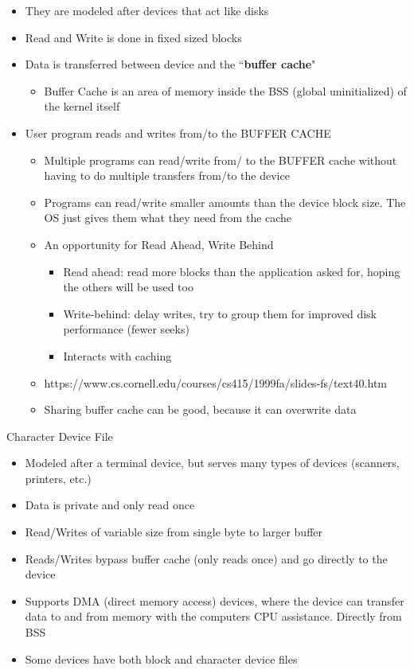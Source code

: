 \begin{itemize}
    \item They are modeled after devices that act like disks
    \item Read and Write is done in fixed sized blocks
    \item Data is transferred between device and the ``\textbf{buffer cache}"
    \begin{itemize}
        \item Buffer Cache is an area of memory inside the BSS (global uninitialized) of the kernel itself
    \end{itemize}
    \item User program reads and writes from/to the BUFFER CACHE
    \begin{itemize}
        \item Multiple programs can read/write from/ to the BUFFER cache without having to do multiple transfers from/to the device
        \item Programs can read/write smaller amounts than the device block size. The OS just gives them what they need from the cache
        \item An opportunity for Read Ahead, Write Behind
        \begin{itemize}
            \item Read ahead: read more blocks than the application asked for, hoping the others will be used too
            \item Write-behind: delay writes, try to group them for improved disk performance (fewer seeks)
            \item Interacts with caching
        \end{itemize}
        \item https://www.cs.cornell.edu/courses/cs415/1999fa/slides-fs/text40.htm
        \item Sharing buffer cache can be good, because it can overwrite  data
    \end{itemize}
\end{itemize}
Character Device File
\begin{itemize}
    \item Modeled after a terminal device, but serves many types of devices (scanners, printers, etc.)
    \item Data is private and only read once
    \item Read/Writes of variable size from single byte to larger buffer
    \item Reads/Writes bypass buffer cache (only reads once) and go directly to the device
    \item Supports DMA (direct memory access) devices, where the device can transfer data to and from memory with the computers CPU assistance. Directly from BSS
    \item Some devices have both block and character device files
\end{itemize}
